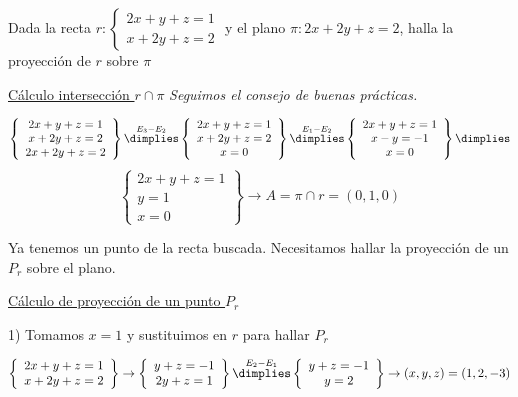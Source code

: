 \begin{problem}

Dada la recta $r:\left\{\begin{array}{c}2x+y+z=1\\x+2y+z=2\end{array}\right.$ y el plano $\pi:2x+2y+z=2$, halla la proyección de $r$ sobre $\pi$

\solution

\ul{Cálculo intersección $r\cap\pi$}
\textit{Seguimos el consejo de buenas prácticas.}

\[
\left\{\begin{array}{c}
2x+y+z=1\\
x+2y+z=2\\
2x+2y+z=2
\end{array}\right\} \overset{E_3-E_2}{\dimplies}
\left\{\begin{array}{c}
2x+y+z=1\\
x+2y+z=2\\
x=0
\end{array}\right\} \overset{E_1-E_2}\dimplies 
\left\{\begin{array}{c}
2x+y+z=1\\
x-y=-1\\
x=0
\end{array}\right\}  \dimplies\]\[
\left\{\begin{array}{c}
2x+y+z=1\\
y=1\\
x=0
\end{array}\right\} \to A = \pi\cap r = (0,1,0)\]

Ya tenemos un punto de la recta buscada. Necesitamos hallar la proyección de un $P_r$ sobre el plano.

\ul{Cálculo de proyección de un punto $P_r$}

1) Tomamos $x=1$ y sustituimos en $r$ para hallar $P_r$

\[
\left\{\begin{array}{c}2x+y+z=1\\x+2y+z=2\end{array}\right\}\to
\left\{\begin{array}{c}
y+z=-1\\
2y+z=1
\end{array}\right\}\overset{E_2-E_1}\dimplies
\left\{\begin{array}{c}
y+z=-1\\
y=2
\end{array}\right\}\to (x,y,z) = (1,2,-3)
\]


\end{problem}
